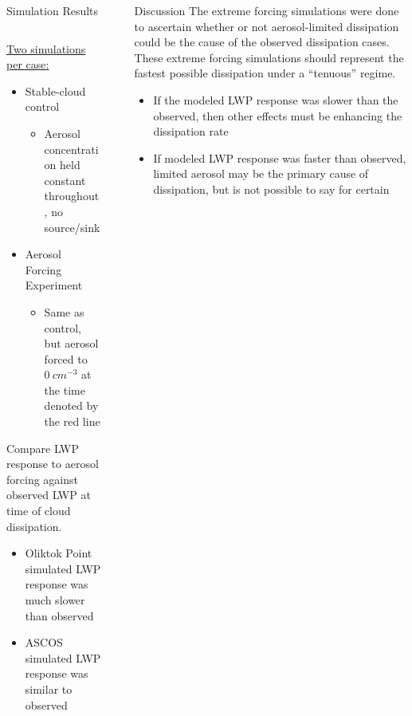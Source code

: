 \documentclass[final]{beamer}
\newlength{\sepwid}
\newlength{\onecolwid}
\newlength{\twocolwid}
\begin{document}
\begin{frame}[t]
\begin{columns}[t]
\begin{column}{\twocolwid}
\begin{alertblock}{Simulation Results}
\begin{column}{0.39\linewidth}
			\underline{Two simulations per case:}
			\begin{itemize}
				\item Stable-cloud control
				\begin{itemize}
					\item Aerosol concentration held constant throughout, no source/sink
				\end{itemize}
				\item Aerosol Forcing Experiment
				\begin{itemize}
					\item Same as control, but aerosol forced to $0\ cm^{-3}$ at the time denoted by the red line
				\end{itemize}
			\end{itemize}

			Compare LWP response to aerosol forcing against observed LWP at time of cloud dissipation.
			\begin{itemize}
				\item Oliktok Point simulated LWP response was much slower than observed
				\item ASCOS simulated LWP response was similar to observed
			\end{itemize}

		\end{column}
	\end{alertblock}
\end{column}



\begin{column}{\sepwid}\end{column}

\begin{column}{\onecolwid}
	\begin{block}{Discussion}
		The extreme forcing simulations were done to ascertain whether or not aerosol-limited dissipation could be the cause of the observed dissipation cases. These extreme forcing simulations should represent the fastest possible dissipation under a ``tenuous'' regime.

		\begin{itemize}
			\item If the modeled LWP response was slower than the observed, then other effects must be enhancing the dissipation rate
			\item If modeled LWP response was faster than observed, limited aerosol may be the primary cause of dissipation, but is not possible to say for certain
		\end{itemize}
		

\end{block}
\end{column}
\end{columns}
\end{frame}
\end{document}
